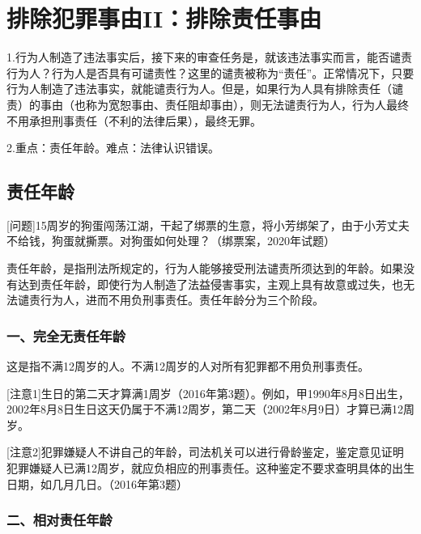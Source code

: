 \chapter{排除犯罪事由II：排除责任事由}

\begin{EditionOpeningPanel}
1.行为人制造了违法事实后，接下来的审查任务是，就该违法事实而言，能否谴责行为人？行为人是否具有可谴责性？这里的谴责被称为“责任”。正常情况下，只要行为人制造了违法事实，就能谴责行为人。但是，如果行为人具有排除责任（谴责）的事由（也称为宽恕事由、责任阻却事由），则无法谴责行为人，行为人最终不用承担刑事责任（不利的法律后果），最终无罪。

2.重点：责任年龄。难点：法律认识错误。
\end{EditionOpeningPanel}

\section{责任年龄}

[问题]15周岁的狗蛋闯荡江湖，干起了绑票的生意，将小芳绑架了，由于小芳丈夫不给钱，狗蛋就撕票。对狗蛋如何处理？（绑票案，2020年试题）


责任年龄，是指刑法所规定的，行为人能够接受刑法谴责所须达到的年龄。如果没有达到责任年龄，即使行为人制造了法益侵害事实，主观上具有故意或过失，也无法谴责行为人，进而不用负刑事责任。责任年龄分为三个阶段。

\subsection*{一、完全无责任年龄}

这是指不满12周岁的人。不满12周岁的人对所有犯罪都不用负刑事责任。

[注意1]生日的第二天才算满1周岁（2016年第3题）。例如，甲1990年8月8日出生，2002年8月8日生日这天仍属于不满12周岁，第二天（2002年8月9日）才算已满12周岁。

[注意2]犯罪嫌疑人不讲自己的年龄，司法机关可以进行骨龄鉴定，鉴定意见证明犯罪嫌疑人已满12周岁，就应负相应的刑事责任。这种鉴定不要求查明具体的出生日期，如几月几日。（2016年第3题）

\subsection*{二、相对责任年龄}

